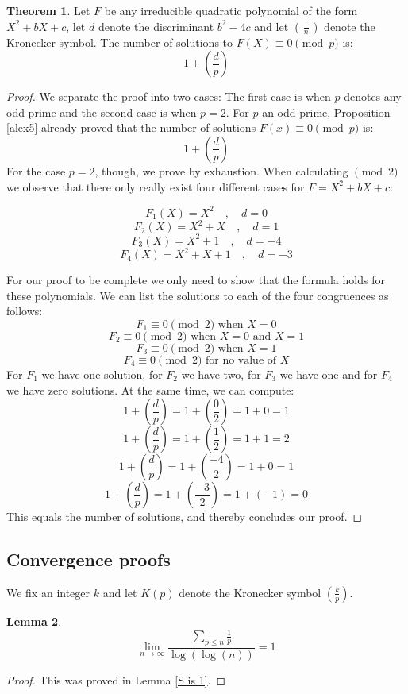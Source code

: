 \documentclass{article}
\theoremstyle{definition}
\newtheorem{theorem}{Theorem}[section]
\newtheorem{lemma}[theorem]{Lemma}
\theoremstyle{remark}
\begin{document}
\begin{theorem} \label{kronecker}
Let $F$ be any irreducible quadratic polynomial of the form $X^2+bX+c$, let $d$ denote the discriminant $b^2-4c$ and let $(\frac{\cdot}{n})$ denote the Kronecker symbol.
The number of solutions to $F(X)\equiv 0 \pmod {p}$ is:
$$1+\left(\frac{d}{p}\right)$$
\end{theorem}
\begin{proof}
We separate the proof into two cases: The first case is when $p$ denotes any odd prime and the second case is when $p=2$.
For $p$ an odd prime, Proposition \ref{alex5} already proved that the number of solutions $F(x)\equiv 0 \pmod {p}$ is:
$$1+\left(\frac{d}{p}\right)$$
For the case $p=2$, though, we prove by exhaustion. When calculating $\pmod{2}$ we observe that there only really exist four different cases for $F=X^2+bX+c$:

$$F_1(X)=X^2 \quad , \quad d=0$$
$$F_2(X)=X^2+X \quad , \quad d=1$$
$$F_3(X)=X^2+1\quad , \quad d=-4$$
$$F_4(X)=X^2+X+1\quad , \quad d=-3$$

For our proof to be complete we only need to show that the formula holds for these polynomials. We can list the solutions to each of the four congruences as follows:
$$F_1\equiv0\pmod{2} \text{ when } X=0$$
$$F_2\equiv0\pmod{2} \text{ when } X=0 \text{ and } X=1$$
$$F_3\equiv0\pmod{2} \text{ when } X=1$$
$$F_4\equiv0\pmod{2} \text{ for no value of }X$$
For $F_1$ we have one solution, for $F_2$ we have two, for $F_3$ we have one and for $F_4$ we have zero solutions. At the same time, we can compute:
$$1+\left(\frac{d}{p}\right)=1+\left(\frac{0}{2}\right)=1+0=1$$
$$1+\left(\frac{d}{p}\right)=1+\left(\frac{1}{2}\right)=1+1=2$$
$$1+\left(\frac{d}{p}\right)=1+\left(\frac{-4}{2}\right)=1+0=1$$
$$1+\left(\frac{d}{p}\right)=1+\left(\frac{-3}{2}\right)=1+(-1)=0$$
This equals the number of solutions, and thereby concludes our proof.
\end{proof}


\subsection{Convergence proofs}
We fix an integer $k$ and let $K(p)$ denote the Kronecker symbol $\left(\frac{k}{p}\right)$.
\begin{lemma}\label{Original S(F)}
$$\lim_{n \rightarrow \infty} \frac{\sum_{p \leq n}\frac{1}{p}}{\log(\log(n))}=1$$
\end{lemma}
\begin{proof}
This was proved in Lemma \ref{S is 1}.
\end{proof}
\end{document}
